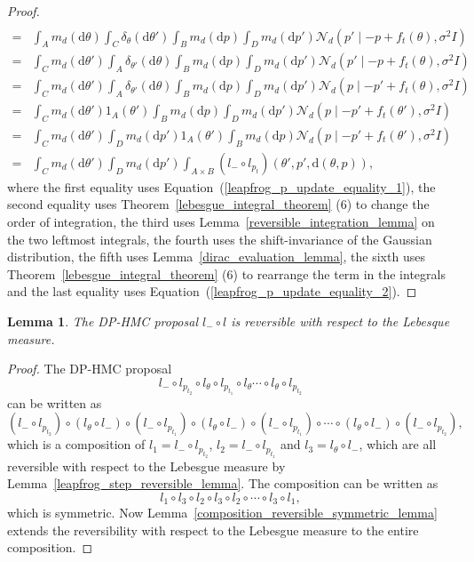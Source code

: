 \documentclass[english,twoside,openright]{HYgraduMLDS}
\newtheorem{lemma}{Lemma}[chapter]
\newcommand{\dx}{\mathrm{d}}
\newcommand{\caln}{{\mathcal{N}}}
\begin{document}
\begin{proof}
\begin{align*}
    \\=& \int_{A}m_{d}(\dx \theta)\int_{C}\delta_{\theta}(\dx \theta')\int_{B}m_{d}(\dx p)
         \int_{D}m_{d}(\dx p') \caln_{d}(p'\mid -p + f_{t}(\theta), \sigma^{2}I)
    \\=& \int_{C}m_{d}(\dx \theta')\int_{A}\delta_{\theta'}(\dx \theta)\int_{B}m_{d}(\dx p)
         \int_{D}m_{d}(\dx p') \caln_{d}(p'\mid -p + f_{t}(\theta), \sigma^{2}I)
    \\=& \int_{C}m_{d}(\dx \theta')\int_{A}\delta_{\theta'}(\dx \theta)\int_{B}m_{d}(\dx p)
         \int_{D}m_{d}(\dx p') \caln_{d}(p\mid -p' + f_{t}(\theta), \sigma^{2}I)
    \\=& \int_{C}m_{d}(\dx \theta')1_{A}(\theta')\int_{B}m_{d}(\dx p)
         \int_{D}m_{d}(\dx p') \caln_{d}(p\mid -p' + f_{t}(\theta'), \sigma^{2}I)
    \\=& \int_{C}m_{d}(\dx \theta')\int_{D}m_{d}(\dx p')1_{A}(\theta')
         \int_{B}m_{d}(\dx p)\caln_{d}(p\mid -p' + f_{t}(\theta'), \sigma^{2}I)
    \\=& \int_{C}m_{d}(\dx\theta')\int_{D}m_{d}(\dx p')
         \int_{A\times B}(l_{-}\circ l_{p_{t}})(\theta', p', \dx(\theta, p)),
  \end{align*}
  where the first equality uses Equation~(\ref{leapfrog_p_update_equality_1}),
  the second equality uses Theorem~\ref{lebesgue_integral_theorem} (6)
  to change the order of integration,
  the third uses Lemma~\ref{reversible_integration_lemma} on the two leftmost
  integrals,
  the fourth uses the shift-invariance of the Gaussian distribution,
  the fifth uses Lemma~\ref{dirac_evaluation_lemma},
  the sixth uses Theorem~\ref{lebesgue_integral_theorem} (6) to rearrange the
  term in the integrals and the last equality uses
  Equation~(\ref{leapfrog_p_update_equality_2}).
\end{proof}

\begin{lemma}\label{leapfrog_reversibility_lemma}
	The DP-HMC proposal \(l_{-} \circ l\) is reversible with respect
  to the Lebesque measure.
\end{lemma}
\begin{proof}
  The DP-HMC proposal
  \[
    l_{-}\circ l_{p_{t_{2}}}\circ l_{\theta}\circ l_{p_{t_{1}}}\circ l_{\theta}
    \dotsb \circ l_{\theta}\circ l_{p_{t_{2}}}
  \]
  can be written as
  \[
    (l_{-}\circ l_{p_{t_{2}}})\circ (l_{\theta} \circ l_{-})\circ (l_{-}\circ l_{p_{t_{1}}})
    \circ (l_{\theta} \circ l_{-}) \circ (l_{-} \circ l_{p_{t_{1}}})\circ
    \dotsb \circ (l_{\theta}\circ l_{-})\circ (l_{-}\circ l_{p_{t_{2}}}),
  \]
  which is a composition of \(l_{1} = l_{-}\circ l_{p_{t_{2}}}\),
  \(l_{2} = l_{-}\circ l_{p_{t_{1}}}\)
  and \(l_{3} = l_{\theta}\circ l_{-}\), which are all reversible with respect to the
  Lebesgue measure by Lemma~\ref{leapfrog_step_reversible_lemma}.
  The composition can be written as
  \[
    l_{1}\circ l_{3}\circ l_{2}\circ l_{3}\circ l_{2}\circ\dotsb \circ l_{3}\circ l_{1},
  \]
  which is symmetric. Now
  Lemma~\ref{composition_reversible_symmetric_lemma} extends the reversibility
  with respect to the Lebesgue measure to the entire composition.
\end{proof}
\end{document}
